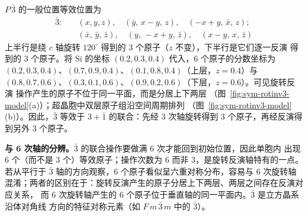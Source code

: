 $P\,\bar3$ 的一般位置等效位置为
\begin{equation}
  \begin{aligned}
    \bar3:\quad &(x,y,z),\quad (\bar y,\,x-y,\,z),\quad (-x+y,\,\bar x,\,z);\\
    &(\bar x,\,\bar y,\,\bar z),\quad (y,\,-x+y,\,\bar z),\quad (x-y,\,x,\,\bar z)
  \end{aligned}
\end{equation}
上半行是绕 $c$ 轴旋转 $120^\circ$ 得到的 3 个原子（$z$ 不变），下半行是它们逐一反演
得到的 3 个原子。将 Si 的坐标 $(0.2,0.3,0.4)$ 代入，6 个原子的分数坐标为
$(0.2,0.3,0.4)$、$(0.7,0.9,0.4)$、$(0.1,0.8,0.4)$（上层，$z=0.4$）与
$(0.8,0.7,0.6)$、$(0.3,0.1,0.6)$、$(0.9,0.2,0.6)$（下层，$z=0.6$）。可见旋转反演
操作产生的原子不位于同一平面，而是分居上下两层
（图~\ref{fig:sym-rotinv3-model}(a)）；超晶胞中双层原子组沿空间周期排列
（图~\ref{fig:sym-rotinv3-model}(b)）。因此，$\bar3$ 等效于 $3+\bar1$ 的联合：先经
3 次轴旋转得到 3 个原子，再经反演得到另外 3 个原子。

\textbf{与 6 次轴的分辨。}$\bar3$ 的联合操作要做满 6 次才能回到初始位置，因此单胞内
出现 6 个（而不是 3 个）等效原子；操作次数为 6 而非 3，是旋转反演轴特有的一点。
若从平行于 $\bar3$ 轴的方向观察，6 个原子看似呈六重对称分布，容易与 6 次旋转轴
混淆；两者的区别在于：旋转反演产生的原子分居上下两层、两层之间存在反演对应关系，
而 6 次旋转轴产生的 6 个原子位于垂直轴的同一平面内。$\bar3$ 是立方晶系沿体对角线
方向的特征对称元素（如 $F\,m\,\bar3\,m$ 中的 $\bar3$）。
